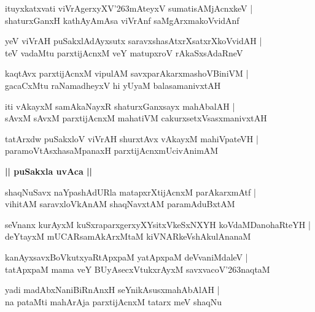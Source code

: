 \documentclass[twoside,12pt,openright]{book}
\def\S{\char'263}
\newcounter{shloka}[chapter]
\def\uvaca#1{\centerline{{\large\textbf{#1}}}}
\begin{document}
\begin{shloka}%
ituyxkatxvati viVrAgerxyXV\S mAteyxV sumatisAMjAcnxkeV |\\
shaturxGanxH kathAyAmAsa viVrAnf saMgArxmakoVvidAnf
\end{shloka}

\begin{shloka}%
yeV viVrAH puSakxlAdAyxsutx saravxshasAtxrXsatxrXkoVvidAH |\\
teV vadaMtu parxtijAcnxM veY matupxroV rAkaSxsAdaRneV 
\end{shloka}

\begin{shloka}%
kaqtAvx parxtijAcnxM vipulAM savxparAkarxmashoVBiniVM |\\
gacaCxMtu raNamadheyxV hi yUyaM balasamanivxtAH 
\end{shloka}

\begin{shloka}%
iti vAkayxM samAkaNayxR shaturxGanxsayx mahAbalAH |\\
sAvxM sAvxM parxtijAcnxM mahatiVM cakurxsetxVsasxmanivxtAH 
\end{shloka}

\begin{shloka}%
tatArxdw puSakxloV viVrAH shurxtAvx vAkayxM mahiVpateVH |\\
paramoVtAsxhasaMpanaxH parxtijAcnxmUcivAnimAM 
\end{shloka}

\uvaca{|| puSakxla uvAca ||}

\begin{shloka}%
shaqNuSavx naYpashAdURla matapxrXtijAcnxM parAkarxmAtf |\\
vihitAM saravxloVkAnAM shaqNavxtAM paramAduBxtAM 
\end{shloka}

\begin{shloka}%
seVnanx kurAyxM kuSxraparxgerxyXYsitxVkeSxNXYH koVdaMDanohaRteYH |\\
deYtayxM mUCARsamAkArxMtaM kiVNARkeVshAkulAnanaM 
\end{shloka}

\begin{shloka}%
kanAyxsavxBoVkutxyaRtApxpaM yatApxpaM deVvaniMdaleV |\\
tatApxpaM mama veY BUyAsecxVtukxrAyxM savxvacoV\S naqtaM 
\end{shloka}

\begin{shloka}%
yadi madAbxNaniBiRnAnxH seYnikAsusxmahAbAlAH |\\
na pataMti mahArAja parxtijAcnxM tatarx meV shaqNu 
\end{shloka}
\end{document}
